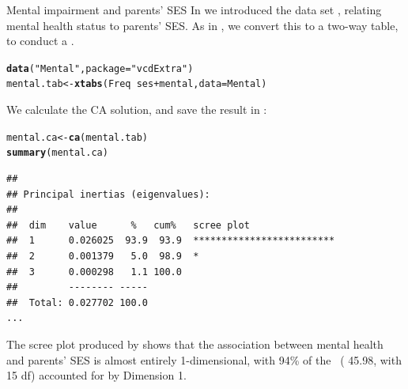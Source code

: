 \documentclass[11pt]{book}\usepackage[]{graphicx}\usepackage[]{color}
\makeatletter
\newcommand{\hlstr}[1]{\textcolor[rgb]{0.192,0.494,0.8}{#1}}%
\newcommand{\hlopt}[1]{\textcolor[rgb]{0,0,0}{#1}}%
\newcommand{\hlstd}[1]{\textcolor[rgb]{0.345,0.345,0.345}{#1}}%
\newcommand{\hlkwb}[1]{\textcolor[rgb]{0.69,0.353,0.396}{#1}}%
\newcommand{\hlkwc}[1]{\textcolor[rgb]{0.333,0.667,0.333}{#1}}%
\newcommand{\hlkwd}[1]{\textcolor[rgb]{0.737,0.353,0.396}{\textbf{#1}}}%
\newenvironment{kframe}{%
 \def\at@end@of@kframe{}%
 \ifinner\ifhmode%
  \def\at@end@of@kframe{\end{minipage}}%
  \begin{minipage}{\columnwidth}%
 \fi\fi%
 \def\FrameCommand##1{\hskip\@totalleftmargin \hskip-\fboxsep
 \colorbox{shadecolor}{##1}\hskip-\fboxsep
     \hskip-\linewidth \hskip-\@totalleftmargin \hskip\columnwidth}%
 \MakeFramed {\advance\hsize-\width
   \@totalleftmargin\z@ \linewidth\hsize
   \@setminipage}}%
 {\par\unskip\endMakeFramed%
 \at@end@of@kframe}
\newenvironment{knitrout}{}{} %
\renewenvironment{knitrout}{\small\renewcommand{\baselinestretch}{.85}}{} %
\makeatother
\begin{document}
\begin{Example}[mental3]{Mental impairment and parents' SES}
In  we introduced the data set , 
relating mental health status to parents' SES.
As in , we convert this to a two-way table, 
to conduct a \ca.

\begin{knitrout}
\color{fgcolor}\begin{kframe}
\begin{alltt}
\hlkwd{data}\hlstd{(}\hlstr{"Mental"}\hlstd{,} \hlkwc{package}\hlstd{=}\hlstr{"vcdExtra"}\hlstd{)}
\hlstd{mental.tab} \hlkwb{<-} \hlkwd{xtabs}\hlstd{(Freq} \hlopt{~} \hlstd{ses} \hlopt{+} \hlstd{mental,} \hlkwc{data}\hlstd{=Mental)}
\end{alltt}
\end{kframe}
\end{knitrout}

We calculate the CA solution, and save the result in :
\begin{knitrout}
\color{fgcolor}\begin{kframe}
\begin{alltt}
\hlstd{mental.ca} \hlkwb{<-} \hlkwd{ca}\hlstd{(mental.tab)}
\hlkwd{summary}\hlstd{(mental.ca)}
\end{alltt}
\begin{verbatim}
## 
## Principal inertias (eigenvalues):
## 
##  dim    value      %   cum%   scree plot               
##  1      0.026025  93.9  93.9  *************************
##  2      0.001379   5.0  98.9  *                        
##  3      0.000298   1.1 100.0                           
##         -------- -----                                 
##  Total: 0.027702 100.0                                 
...
\end{verbatim}
\end{kframe}
\end{knitrout}

The scree plot produced by 
shows that the association between mental health
and parents' SES is almost entirely 1-dimensional, with 94\% of
the \chisq\ ( 45.98, with 15 df) accounted for by Dimension 1.


\end{Example}
\end{document}
